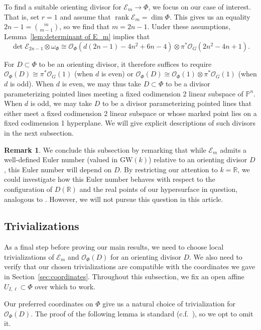 \documentclass[12pt]{amsart}
\numberwithin{equation}{section}
\theoremstyle{plain}
\theoremstyle{definition}
\newtheorem{rem}[thm]{Remark}
\newcommand{\mb}[1]{\mathbb{#1}}
\newcommand{\mc}[1]{\mathcal{#1}}
\newcommand{\GW}{\mathrm{GW}}
\newcommand{\rank}{\operatorname{rank}}
\begin{document}
To find a suitable orienting divisor for $\mc{E}_m\to\Phi$, we focus on our case of interest. That is, set $r=1$ and assume that $\rank\mc{E}_m=\dim\Phi$. This gives us an equality $2n-1=\binom{m}{m-1}$, so we find that $m=2n-1$. Under these assumptions, Lemma~\ref{lem:determinant of E_m} implies that
\[\det\mc{E}_{2n-1}\otimes\omega_\Phi\cong\mc{O}_\Phi(d(2n-1)-4n^2+6n-4)\otimes\pi^*\mc{O}_{G}(2n^2-4n+1).\]

For $D\subset\Phi$ to be an orienting divisor, it therefore suffices to require $\mc{O}_\Phi(D)\cong\pi^*\mc{O}_{G}(1)$ (when $d$ is even) or $\mc{O}_\Phi(D)\cong\mc{O}_\Phi(1)\otimes\pi^*\mc{O}_{G}(1)$ (when $d$ is odd). When $d$ is even, we may thus take $D\subset\Phi$ to be a divisor parameterizing pointed lines meeting a fixed codimension 2 linear subspace of $\mb{P}^n$. When $d$ is odd, we may take $D$ to be a divisor parameterizing pointed lines that either meet a fixed codimension 2 linear subspace or whose marked point lies on a fixed codimension 1 hyperplane. We will give explicit descriptions of such divisors in the next subsection.

\begin{rem}
We conclude this subsection by remarking that while $\mc{E}_m$ admits a well-defined Euler number (valued in $\GW(k)$) relative to an orienting divisor $D$, this Euler number will depend on $D$. By restricting our attention to $k=\mb{R}$, we could investigate how this Euler number behaves with respect to the configuration of $D(\mb{R})$ and the real points of our hypersurface in question, analogous to \cite{LV21}. However, we will not pursue this question in this article.
\end{rem}

\subsection{Trivializations}
As a final step before proving our main results, we need to choose local trivializations of $\mc{E}_m$ and $\mc{O}_\Phi(D)$ for an orienting divisor $D$. We also need to verify that our chosen trivializations are compatible with the coordinates we gave in Section~\ref{sec:coordinates}. Throughout this subsection, we fix an open affine $U_{I,\ell}\subset\Phi$ over which to work.

Our preferred coordinates on $\Phi$ give us a natural choice of trivialization for $\mc{O}_\Phi(D)$. The proof of the following lemma is standard (c.f.~\cite[Lemma~3.8 and Proposition~5.1]{osculating}), so we opt to omit it.
\end{document}
